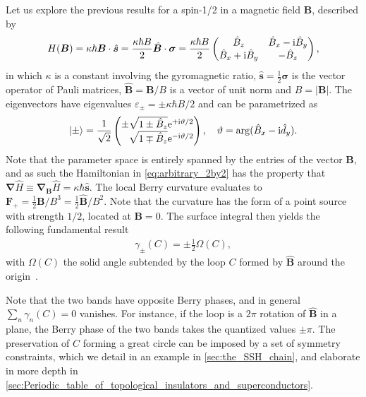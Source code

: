 Let us explore the previous results for a spin-1/2 in a magnetic field $\bm B$, described by
\begin{align}
    H(\bm B) = \kappa\hbar\bm B\cdot\hat{\bm s} = \frac{\kappa\hbar B}2 \hat{\bm B}\cdot\bm\sigma
    =
    \frac{\kappa\hbar B}2
    \begin{pmatrix}
        \hat{B}_z & \hat{B}_x - \mathrm i \hat{B}_y \\
        \hat{B}_x + \mathrm i \hat{B}_y & -\hat{B}_z
    \end{pmatrix},
    \label{eq:arbitrary_2by2}
\end{align}
in which $\kappa$ is a constant involving the gyromagnetic ratio, $\hat{\bm s} = \frac12{\bm \sigma}$ is the vector operator of Pauli matrices, $\hat{\bm B}={\bm B}/B$ is a vector of unit norm and $B = |\bm B|$.
The eigenvectors have eigenvalues $\varepsilon_\pm = \pm \kappa\hbar B/2$ and can be parametrized as
\begin{align}
    \ket{\pm} = \frac{1}{\sqrt{2}}
    \begin{pmatrix}
        \pm \sqrt{1 \pm \hat{B}_z}\re^{+\ri\vartheta/2}\\
        \phantom\pm\sqrt{1 \mp \hat{B}_z}\re^{-\ri\vartheta/2}
    \end{pmatrix}
    ,
    \quad
    \vartheta = \arg(\hat{B}_x-\ri \hat{d}_y).
\end{align}
Note that the parameter space is entirely spanned by the entries of the vector $\bm B$, and as such the Hamiltonian in \cref{eq:arbitrary_2by2} has the property that $\bm\nabla\hat H \equiv \bm\nabla_{\bm B}\hat H = \kappa\hbar\hat{\bm s}$.
The local Berry curvature evaluates to ${\bm F}_+ = \frac12\bm B/B^3=\frac12\hat{\bm B}/B^2$.
Note that the curvature has the form of a point source with strength $1/2$, located at $\bm B=0$.
The surface integral then yields the following fundamental result
\begin{align}
    \gamma_{\pm}(C) = \pm\frac12\Omega(C),
\end{align}
with $\Omega(C)$ the solid angle subtended by the loop $C$ formed by $\hat {\bm B}$ around the origin~\cite{Berry1984}.

Note that the two bands have opposite Berry phases, and in general $\sum_n\gamma_n(C)=0$ vanishes.
For instance, if the loop is a $2\pi$ rotation of $\hat{\bm B}$ in a plane, the Berry phase of the two bands takes the quantized values $\pm\pi$.
The preservation of $C$ forming a great circle can be imposed by a set of symmetry constraints, which we detail in an example in \cref{sec:the_SSH_chain}, and elaborate in more depth in \cref{sec:Periodic_table_of_topological_insulators_and_superconductors}.

